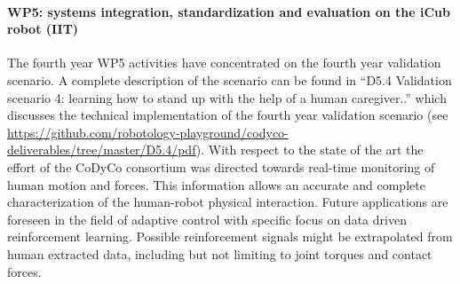 
\paragraph*{WP5: systems integration, standardization and evaluation on the iCub robot (IIT)}

The fourth year WP5 activities have concentrated on the fourth year validation scenario. A complete description of the 
scenario can be found in ``D5.4 Validation scenario 4: learning how to stand up with the help of a human caregiver..'' 
which discusses the technical implementation of the fourth year validation scenario (see 
\url{https://github.com/robotology-playground/codyco-deliverables/tree/master/D5.4/pdf}). With respect to the state of 
the art the effort of the CoDyCo consortium was directed towards real-time monitoring of human motion and forces.
This information allows an accurate and complete characterization of the human-robot physical interaction. Future
applications are foreseen in the field of adaptive control with specific focus on data driven reinforcement
learning. Possible reinforcement signals might be extrapolated from human extracted data, including but not limiting
to joint torques and contact forces.